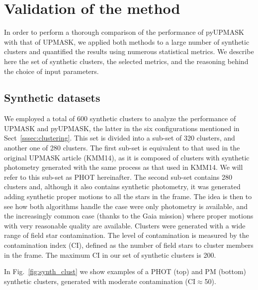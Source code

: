 \documentclass{aa}
\begin{document}
\section{Validation of the method}
 \label{sec:validation}

 In order to perform a thorough comparison of the performance of pyUPMASK
 with that of UPMASK, we applied both methods to a large number of synthetic
 clusters and quantified the results using numerous statistical metrics.
 We describe here the set of synthetic clusters, the selected metrics, and the
 reasoning behind the choice of input parameters.



\subsection{Synthetic datasets}
 \label{ssec:synthetic}

 We employed a total of 600 synthetic clusters to analyze the performance of
 UPMASK and pyUPMASK, the latter in the six configurations mentioned in
 Sect~\ref{sssec:clustering}. This set is divided into a sub-set of 320
 clusters, and another one of 280 clusters. The first sub-set is equivalent to
 that used in the original UPMASK article (KMM14), as it is composed of
 clusters with synthetic photometry generated with the same process as that
 used in KMM14. We will refer to this sub-set as PHOT hereinafter.
 The second sub-set contains 280 clusters and, although it also contains
 synthetic photometry, it was generated adding synthetic proper motions to all
 the stars in the frame.
 The idea is then to see how both algorithms handle the case were only
 photometry is available, and the increasingly common case (thanks to the Gaia
 mission) where proper motions with very reasonable quality are available.
 Clusters were generated with a wide range of field star contamination.
 The level of contamination is measured by the contamination index (CI),
 defined as the number of field stars to cluster members in the frame. The
 maximum CI in our set of synthetic clusters is 200.

 In Fig.~\ref{fig:synth_clust} we show examples of a PHOT (top) and PM
 (bottom) synthetic clusters, generated with moderate contamination 
 (CI$\approx$50).
\end{document}
